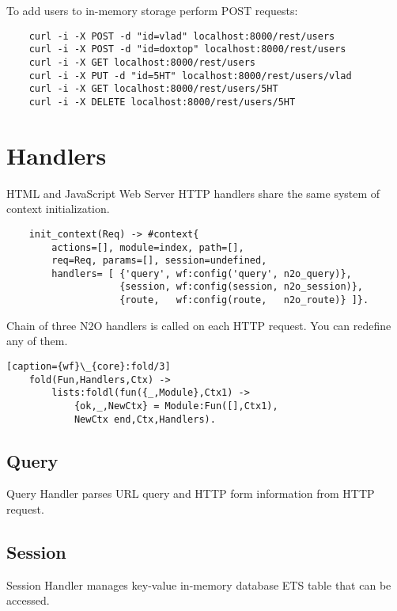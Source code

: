 To add users to in-memory storage perform POST requests:

\vspace{1\baselineskip}
\begin{lstlisting}
    curl -i -X POST -d "id=vlad" localhost:8000/rest/users
    curl -i -X POST -d "id=doxtop" localhost:8000/rest/users
    curl -i -X GET localhost:8000/rest/users
    curl -i -X PUT -d "id=5HT" localhost:8000/rest/users/vlad
    curl -i -X GET localhost:8000/rest/users/5HT
    curl -i -X DELETE localhost:8000/rest/users/5HT
\end{lstlisting}
\vspace{1\baselineskip}

\section{Handlers}
HTML and JavaScript Web Server HTTP handlers share the same system
of context initialization. 

\vspace{1\baselineskip}
\begin{lstlisting}
    init_context(Req) -> #context{
        actions=[], module=index, path=[],
        req=Req, params=[], session=undefined,
        handlers= [ {'query', wf:config('query', n2o_query)},
                    {session, wf:config(session, n2o_session)},
                    {route,   wf:config(route,   n2o_route)} ]}.
\end{lstlisting}
\vspace{1\baselineskip}

Chain of three N2O handlers is called
on each HTTP request. You can redefine any of them.

\vspace{1\baselineskip}
\begin{lstlisting}[caption={wf}\_{core}:fold/3]
    fold(Fun,Handlers,Ctx) ->
        lists:foldl(fun({_,Module},Ctx1) ->
            {ok,_,NewCtx} = Module:Fun([],Ctx1),
            NewCtx end,Ctx,Handlers).
\end{lstlisting}
\vspace{1\baselineskip}

\subsection{Query}
Query Handler parses URL query and HTTP form information from HTTP request.

\subsection{Session}
Session Handler manages key-value in-memory database ETS table that can be accessed.

